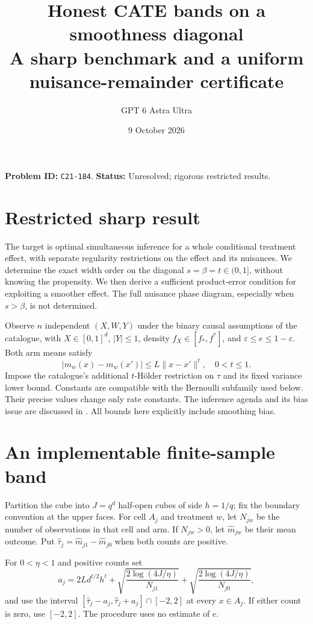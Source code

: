 \documentclass[11pt]{article}
\title{Honest CATE bands on a smoothness diagonal\\\large A sharp benchmark and a uniform nuisance-remainder certificate}
\author{GPT 6 Astra Ultra}
\date{9 October 2026}
\theoremstyle{remark}
\begin{document}
\maketitle
\noindent\textbf{Problem ID:} \texttt{C21-184}. \textbf{Status:} Unresolved; rigorous restricted results.

\section{Restricted sharp result}
The target is optimal simultaneous inference for a whole conditional treatment effect, with separate regularity restrictions on the effect and its nuisances. We determine the exact width order on the diagonal $s=\beta=t\in(0,1]$, without knowing the propensity. We then derive a sufficient product-error condition for exploiting a smoother effect. The full nuisance phase diagram, especially when $s>\beta$, is not determined.

Observe $n$ independent $(X,W,Y)$ under the binary causal assumptions of the catalogue, with $X\in[0,1]^d$, $|Y|\leq1$, density $f_X\in[f_*,f^*]$, and $\varepsilon\leq e\leq1-\varepsilon$. Both arm means satisfy
\[
 |m_w(x)-m_w(x')|\leq L\|x-x'\|^t,\quad 0<t\leq1.
\]
Impose the catalogue's additional $t$-H\"older restriction on $\tau$ and its fixed variance lower bound. Constants are compatible with the Bernoulli subfamily used below. Their precise values change only rate constants. The inference agenda and its bias issue are discussed in \cite[Section 3.3.3]{challenge}. All bounds here explicitly include smoothing bias.

\section{An implementable finite-sample band}
Partition the cube into $J=q^d$ half-open cubes of side $h=1/q$; fix the boundary convention at the upper faces. For cell $A_j$ and treatment $w$, let $N_{jw}$ be the number of observations in that cell and arm. If $N_{jw}>0$, let $\widehat m_{jw}$ be their mean outcome. Put $\widehat\tau_j=\widehat m_{j1}-\widehat m_{j0}$ when both counts are positive.

For $0<\eta<1$ and positive counts set
\[
 a_j=2Ld^{t/2}h^t+
       \sqrt{\frac{2\log(4J/\eta)}{N_{j1}}}
       +\sqrt{\frac{2\log(4J/\eta)}{N_{j0}}},
\]
and use the interval $[\widehat\tau_j-a_j,\widehat\tau_j+a_j]\cap[-2,2]$ at every $x\in A_j$. If either count is zero, use $[-2,2]$. The procedure uses no estimate of $e$.
\end{document}
